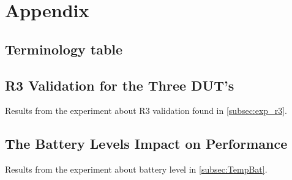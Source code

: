 \chapter{Appendix}\label{ch:appAlabel}

\section{Terminology table}


\newpage


\newpage


\newpage

\section{R3 Validation for the Three DUT's}\label{app:r3_validation}
Results from the experiment about R3 validation found in \cref{subsec:exp_r3}.



\newpage



\newpage


\newpage


\section{The Battery Levels Impact on Performance}\label{app:charge}
Results from the experiment about battery level in \cref{subsec:TempBat}.



\newpage

